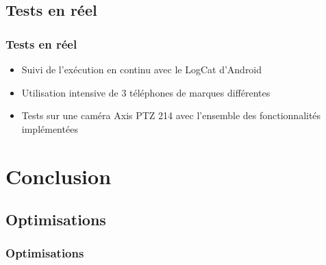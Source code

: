 \documentclass{beamer}
\begin{document}
\subsection{Tests en réel}
 \begin{frame}
   \frametitle{Tests en réel}
\begin{itemize}
    \item<2-> Suivi de l'exécution en continu avec le LogCat d'Android
    \item<3-> Utilisation intensive de 3 téléphones de marques différentes
    \item<4-> Tests sur une caméra Axis PTZ 214 avec l'ensemble des
    fonctionnalités implémentées
   \end{itemize}
\end{frame}

\section{Conclusion}
\subsection{Optimisations}
 \begin{frame}
   \frametitle{Optimisations}

\end{frame}
\end{document}
